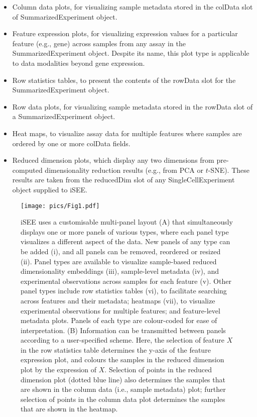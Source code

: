\documentclass[10pt,a4paper,twocolumn]{article}
\begin{document}
\begin{itemize}
\item Column data plots, for visualizing sample metadata stored in the colData slot of SummarizedExperiment object.
\item Feature expression plots, for visualizing expression values for a particular feature (e.g., gene) across samples from any assay in the SummarizedExperiment object.
Despite its name, this plot type is applicable to data modalities beyond gene expression.
\item Row statistics tables, to present the contents of the rowData slot for the SummarizedExperiment object.
\item Row data plots, for visualizing sample metadata stored in the rowData slot of a SummarizedExperiment object.
\item Heat maps, to visualize assay data for multiple features where samples are ordered by one or more colData fields.
\item Reduced dimension plots, which display any two dimensions from pre-computed dimensionality reduction results (e.g., from PCA or $t$-SNE).
These results are taken from the reducedDim slot of any SingleCellExperiment object supplied to iSEE.
\end{itemize}

\begin{figure*}[t]
\texttt{[image: pics/Fig1.pdf]}
\caption{iSEE uses a customisable multi-panel layout (A) that simultaneously displays one or more panels of various types, where each panel type visualizes a different aspect of the data.
New panels of any type can be added (i), and all panels can be removed, reordered or resized (ii).
Panel types are available to visualize sample-based reduced dimensionality embeddings (iii), sample-level metadata (iv), and experimental observations across samples for each feature (v).
Other panel types include row statistics tables (vi), to facilitate searching across features and their metadata; heatmaps (vii), to visualize experimental observations for multiple features; and feature-level metadata plots.
Panels of each type are colour-coded for ease of interpretation.
(B) Information can be transmitted between panels according to a user-specified scheme.
Here, the selection of feature $X$ in the row statistics table determines the y-axis of the feature expression plot, and colours the samples in the reduced dimension plot by the expression of $X$.
Selection of points in the reduced dimension plot (dotted blue line) also determines the samples that are shown in the column data (i.e., sample metadata) plot;
further selection of points in the column data plot determines the samples that are shown in the heatmap.
}
\label{fig:iSEE}
\end{figure*}
\end{document}
